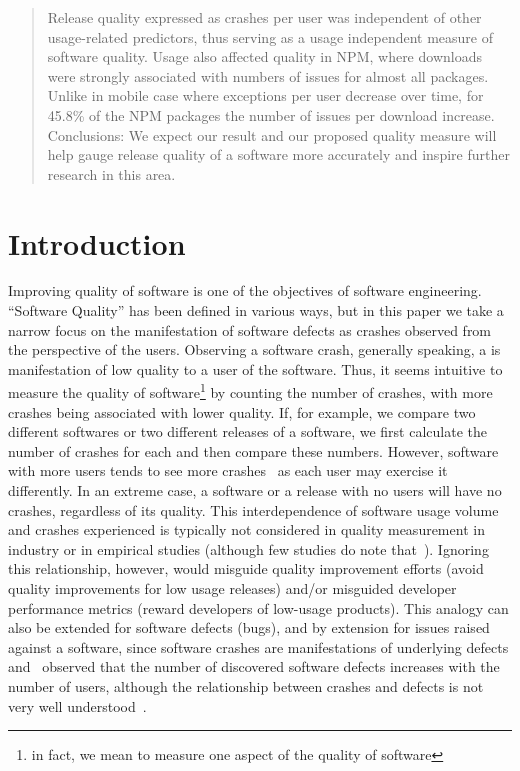 \documentclass[smallextended]{svjour3}       %
\begin{document}
\begin{abstract}
  Release quality expressed as crashes per user was independent of
  other usage-related predictors, thus serving as a usage independent
  measure of software quality. Usage also affected quality in NPM, where
  downloads were strongly associated with numbers of issues for
  almost all packages. Unlike in mobile case where exceptions per
  user decrease over time, %
  for 45.8\% of the NPM packages the number of issues per download
  increase.
Conclusions: We expect our result and our proposed quality measure will help
  gauge release quality of a software more accurately and inspire further 
  research in this area.

\end{abstract}

\section{Introduction}\label{s:intro}

Improving quality of software is one of the objectives of software
engineering.  ``Software Quality'' has been defined in various ways,
but in this paper we take a narrow focus on the manifestation of software
defects as crashes observed from the perspective of the
users. Observing a software crash, generally speaking, a is
manifestation of low quality to a user of the software. 
Thus, it seems intuitive to measure the quality of software\footnote{in fact, we
  mean to measure one aspect of the quality of software}
by counting the number of crashes, with more crashes being associated
with lower quality. If, for example, we compare 
two different softwares or two different releases of a software,
we first calculate the number of crashes for each and then compare
these numbers. However, software with more users tends
to see more crashes~\cite{dey2018modeling,hmps15,IQ08} as each user
may exercise it differently. In
an extreme case, a software or a release with no users will have
no crashes, regardless of its quality. This interdependence of
software usage volume and crashes experienced is typically not
considered in quality measurement in industry or in empirical studies (although few studies
do note that~\cite{fenton2008using,fenton1999critique}).
Ignoring this relationship, however, would misguide quality
improvement efforts (avoid quality improvements for low usage
releases) and/or misguided developer
performance metrics (reward developers of low-usage products). This analogy can also be extended for software
defects (bugs), and by extension for issues raised against a
software, since software crashes are manifestations of underlying
defects and~\cite{caper,hmps15} observed that the number of
discovered software defects increases with the number of users,
although the relationship between crashes and defects is not very
well understood~\cite{fenton1999critique}.  
\end{document}
